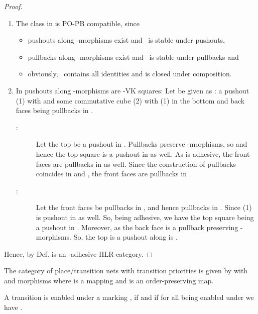 \begin{theorem}
  \label{l.madHLR.posets}
\end{theorem}

\begin{proof}~

	\begin{enumerate}
		\item The class  in   is  PO-PB compatible, since
		\begin{itemize}
			\item pushouts along \M-morphisms exist and \M \ is stable under pushouts,
		  \item pullbacks along \M-morphisms exist and \M \ is stable under pullbacks and
		  \item obviously, \M \ contains all identities and is closed under composition.
	\end{itemize}
	\item  In  pushouts along \M-morphisms are -VK squares:
	  Let be given as : a  pushout (1) with   and some commutative cube (2) with (1) in
the bottom and back faces being pullbacks in .


  \hfill
     	
 
 \begin{description}
	 \item[:] Let the top be a pushout in . Pullbacks preserve  \M-morphisms, so   and  
	      hence the top square is a pushout in  as well. As  is adhesive, the front faces are pullbacks in  as well.
				Since the construction of pullbacks coincides in  and , the front faces are pullbacks in .
	
   \item[:] Let the front faces be pullbacks in , and hence pullbacks in . Since 
	      (1) is pushout in  as well. So,  being adhesive, we have the top square being a pushout 
				in . Moreover,  as the back face is a pullback  preserving \M-morphisms. So, the top
				is a pushout along  is .
 \end{description}

\end{enumerate}
    Hence, by Def. \label{d.madHLR}   is an -adhesive HLR-category.
\end{proof}



\begin{definition}
   The category of  place/transition nets with  transition priorities   is given by 
	with  and
	morphisms  where  is a mapping and  is an order-preserving map.
	
	A transition  is enabled under a marking , if  and if for all  being enabled under  we have .
\end{definition}

